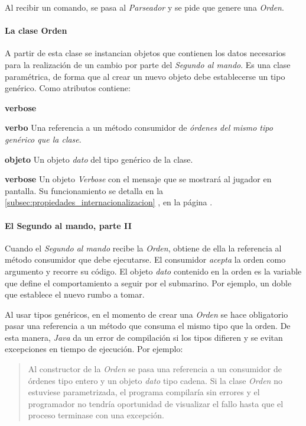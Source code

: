 \documentclass[a4paper,
	11pt,
	parskip=full,
	bibliography=totoc,
	twoside
	]{scrartcl}
\begin{document}
			Al recibir un comando, se pasa al \textit{Parseador} y se pide que genere una \textit{Orden}.
			
		\paragraph{La clase Orden}
			A partir de esta clase se instancian objetos que contienen los datos necesarios para la realización de un cambio por parte del \textit{Segundo al mando}. Es una clase paramétrica, de forma que al crear un nuevo objeto debe establecerse un tipo genérico. Como atributos contiene:
			\begin{labeling}{\textbf{verbose}}
				\item[\textbf{verbo}] Una referencia a un método consumidor de \textit{órdenes del mismo tipo genérico que la clase}.
				\item[\textbf{objeto}] Un objeto \textit{dato} del tipo genérico de la clase.
				\item[\textbf{verbose}] Un objeto \textit{Verbose} con el mensaje que se mostrará al jugador en pantalla. Su funcionamiento se detalla en la \autoref{subsec:propiedades_internacionalizacion} , en la página \pageref{subsec:propiedades_internacionalizacion}.
			\end{labeling}
		
			
		\paragraph{El Segundo al mando, parte II}
			Cuando el \textit{Segundo al mando} recibe la \textit{Orden}, obtiene de ella la referencia al método consumidor que debe ejecutarse. El consumidor \textit{acepta} la orden como argumento y recorre su código. El objeto \textit{dato} contenido en la orden es la variable que define el comportamiento a seguir por el submarino. Por ejemplo, un doble que establece el nuevo rumbo a tomar.
			
			Al usar tipos genéricos, en el momento de crear una \textit{Orden} se hace obligatorio pasar una referencia a un método que consuma el mismo tipo que la orden. De esta manera, \textit{Java} da un error de compilación si los tipos difieren y se evitan excepciones en tiempo de ejecución. Por ejemplo:
			\begin{quote}
				Al constructor de la \textit{Orden} se pasa una referencia a un consumidor de órdenes tipo entero y un objeto \textit{dato} tipo cadena. Si la clase \textit{Orden} no estuviese parametrizada, el programa compilaría sin errores y el programador no tendría oportunidad de visualizar el fallo hasta que el proceso terminase con una excepción.
			\end{quote}
			
\end{document}
